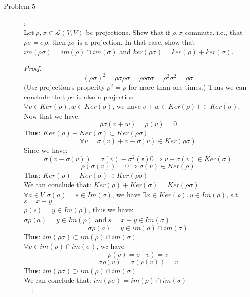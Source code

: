 \documentclass{article}
\begin{document}
\begin{description}
\item[Problem 5]:\\
Let $\rho, \sigma\in\mathcal{L}(V,V)$ be projections. Show that if $\rho, \sigma$ commute, i.e., that $\rho\sigma = \sigma\rho$, then $\rho\sigma$ is a projection. In that case, show that $im(\rho\sigma) = im(\rho)\cap im(\sigma)$ and $ker(\rho\sigma) = ker(\rho) + ker(\sigma)$.
\begin{proof}
	$$(\rho\sigma)^2 = \rho\sigma\rho\sigma = \rho\rho\sigma\sigma = \rho^2\sigma^2 = \rho\sigma$$
	(Use projection's properity $\rho^2 = \rho$ for more than one times.)
	Thus we can conclude that $\rho\sigma$ is also a projection.\\
	$\forall v \in Ker(\rho), w \in Ker(\sigma)$, we have $v+w \in  Ker(\rho) + \in Ker(\sigma)$. Now that we have:
	$$\rho\sigma(v+w) = \rho(v) = 0$$
	Thus: $Ker(\rho) + Ker(\sigma) \subset Ker(\rho\sigma) $ \\
	$$\forall v = \sigma(v) + v - \sigma(v)\in Ker(\rho\sigma)$$ 
	Since we have: \\
	$$\sigma(v - \sigma(v)) = \sigma(v) - \sigma^2(v)0 \Rightarrow v-\sigma(v) \in Ker(\sigma)$$ 
	$$\rho(\sigma(v)) = 0 \Rightarrow \sigma(v) \in Ker(\rho)$$ 
	Thus: $Ker(\rho) + Ker(\sigma) \supset Ker(\rho\sigma) $ \\
	We can conclude that: $Ker(\rho) + Ker(\sigma) = Ker(\rho\sigma) $ \\
	$\forall a \in V$
	$\sigma(a) = s \in Im(\sigma)$, we have $\exists x \in Ker(\rho), y \in Im(\rho)$, s.t. $s = x + y$\\
	$\rho(s) = y \in Im(\rho)$, thus we have:\\
	$\sigma\rho(a) = y \in Im(\rho)$ and $s = x + y \in Im(\sigma)$
	$$ \sigma\rho(a) = y \in im(\rho)\cap im(\sigma)$$
	Thus: $im(\rho\sigma) \subset im(\rho)\cap im(\sigma)$ \\
	$\forall v \in im(\rho)\cap im(\sigma)$, we have
	$$\rho(v) = \sigma(v) = v$$
	$$\sigma\rho(v) = \sigma(\rho(v)) = v$$
	Thus: $im(\rho\sigma) \supset im(\rho)\cap im(\sigma)$ \\
	We can conclude that: $im(\rho\sigma) = im(\rho)\cap im(\sigma)$ \\


\end{proof}

\end{description}
\end{document}
